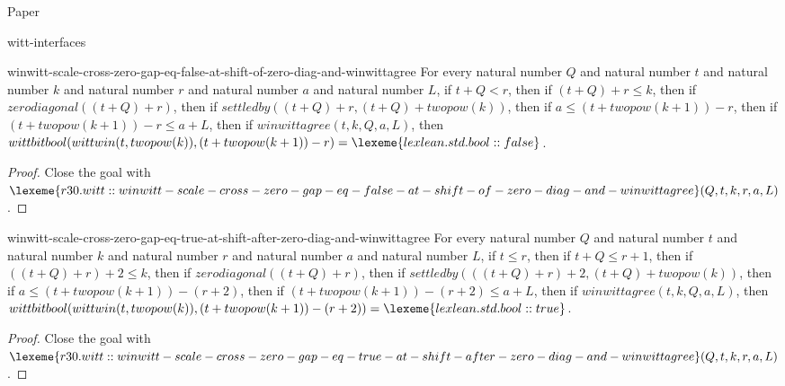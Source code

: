 \begin{lexlean}{Paper}
\begin{section}{witt-interfaces}
  \begin{theorem}{winwitt-scale-cross-zero-gap-eq-false-at-shift-of-zero-diag-and-winwittagree}
  For every natural number \(Q\) and natural number \(t\) and natural number \(k\) and natural number \(r\) and natural number \(a\) and natural number \(L\), if \(t + Q < r\), then if \((t + Q) + r ≤ k\), then if \(zerodiagonal((t + Q) + r)\), then if \(settledby((t + Q) + r, (t + Q) + twopow(k))\), then if \(a ≤ (t + twopow(k + 1)) - r\), then if \((t + twopow(k + 1)) - r ≤ a + L\), then if \(winwittagree(t, k, Q, a, L)\), then \(wittbitbool(wittwin(t, twopow(k)), (t + twopow(k + 1)) - r) = \lexeme{lexlean.std.bool::false}\).
  \begin{proof}
  Close the goal with \(\lexeme{r30.witt::winwitt-scale-cross-zero-gap-eq-false-at-shift-of-zero-diag-and-winwittagree}(Q, t, k, r, a, L)\).
  \end{proof}
  \end{theorem}

  \begin{theorem}{winwitt-scale-cross-zero-gap-eq-true-at-shift-after-zero-diag-and-winwittagree}
  For every natural number \(Q\) and natural number \(t\) and natural number \(k\) and natural number \(r\) and natural number \(a\) and natural number \(L\), if \(t ≤ r\), then if \(t + Q ≤ r + 1\), then if \(((t + Q) + r) + 2 ≤ k\), then if \(zerodiagonal((t + Q) + r)\), then if \(settledby(((t + Q) + r) + 2, (t + Q) + twopow(k))\), then if \(a ≤ (t + twopow(k + 1)) - (r + 2)\), then if \((t + twopow(k + 1)) - (r + 2) ≤ a + L\), then if \(winwittagree(t, k, Q, a, L)\), then \(wittbitbool(wittwin(t, twopow(k)), (t + twopow(k + 1)) - (r + 2)) = \lexeme{lexlean.std.bool::true}\).
  \begin{proof}
  Close the goal with \(\lexeme{r30.witt::winwitt-scale-cross-zero-gap-eq-true-at-shift-after-zero-diag-and-winwittagree}(Q, t, k, r, a, L)\).
  \end{proof}
  \end{theorem}


\end{section}
\end{lexlean}
